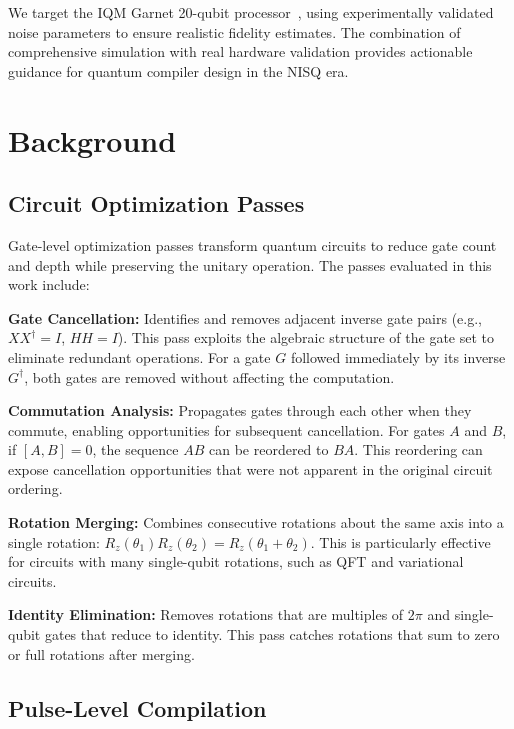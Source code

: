 \documentclass[journal]{IEEEtran}
\begin{document}
We target the IQM Garnet 20-qubit processor~\cite{iqm2024garnet}, using experimentally validated noise parameters to ensure realistic fidelity estimates. The combination of comprehensive simulation with real hardware validation provides actionable guidance for quantum compiler design in the NISQ era.

\section{Background}
\label{sec:background}

\subsection{Circuit Optimization Passes}

Gate-level optimization passes transform quantum circuits to reduce gate count and depth while preserving the unitary operation. The passes evaluated in this work include:

\textbf{Gate Cancellation:} Identifies and removes adjacent inverse gate pairs (e.g., $XX^{\dagger} = I$, $HH = I$). This pass exploits the algebraic structure of the gate set to eliminate redundant operations. For a gate $G$ followed immediately by its inverse $G^{\dagger}$, both gates are removed without affecting the computation.

\textbf{Commutation Analysis:} Propagates gates through each other when they commute, enabling opportunities for subsequent cancellation. For gates $A$ and $B$, if $[A, B] = 0$, the sequence $AB$ can be reordered to $BA$. This reordering can expose cancellation opportunities that were not apparent in the original circuit ordering.

\textbf{Rotation Merging:} Combines consecutive rotations about the same axis into a single rotation: $R_z(\theta_1)R_z(\theta_2) = R_z(\theta_1 + \theta_2)$. This is particularly effective for circuits with many single-qubit rotations, such as QFT and variational circuits.

\textbf{Identity Elimination:} Removes rotations that are multiples of $2\pi$ and single-qubit gates that reduce to identity. This pass catches rotations that sum to zero or full rotations after merging.

\subsection{Pulse-Level Compilation}
\end{document}
